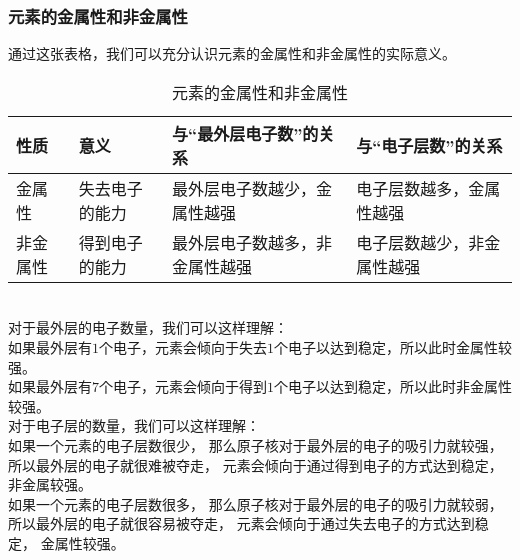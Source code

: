 \documentclass[UTF8]{ctexart}
\begin{document}
\subsubsection{元素的金属性和非金属性}
    通过这张表格，我们可以充分认识元素的金属性和非金属性的实际意义。
    \begin{table}[h]
        \begin{center}
            \begin{tabular}{l|l|l|l}
                \hline
                性质\qquad\qquad&意义\qquad\qquad\qquad\qquad&与“最外层电子数”的关系\qquad\qquad\qquad&与“电子层数”的关系\qquad\qquad\qquad\\ \hline
                金属性&失去电子的能力&最外层电子数越少，金属性越强&电子层数越多，金属性越强\\ \hline
                非金属性&得到电子的能力&最外层电子数越多，非金属性越强&电子层数越少，非金属性越强\\ \hline
            \end{tabular}
            \caption{元素的金属性和非金属性}
        \end{center}
    \end{table}\\
    对于最外层的电子数量，我们可以这样理解：\\[2mm]
    如果最外层有$1$个电子，元素会倾向于失去$1$个电子以达到稳定，所以此时金属性较强。\\[2mm]
    如果最外层有$7$个电子，元素会倾向于得到$1$个电子以达到稳定，所以此时非金属性较强。\\[6mm]
    对于电子层的数量，我们可以这样理解：\\[2mm]
    如果一个元素的电子层数很少，
    那么原子核对于最外层的电子的吸引力就较强，
    所以最外层的电子就很难被夺走，
    元素会倾向于通过得到电子的方式达到稳定，
    非金属较强。\\[2mm]
    如果一个元素的电子层数很多，
    那么原子核对于最外层的电子的吸引力就较弱，
    所以最外层的电子就很容易被夺走，
    元素会倾向于通过失去电子的方式达到稳定，
    金属性较强。

\newpage
\end{document}
